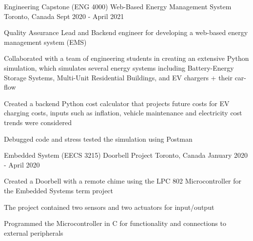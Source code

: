 


\begin{cventries}


\cventry
{Engineering Capstone (ENG 4000)} %
{Web-Based Energy Management System} %
{Toronto, Canada} %
{Sept 2020 - April 2021} %
{ %
\begin{cvitems}
\item {Quality Assurance Lead and Backend engineer for developing a web-based energy management system (EMS)}
\item {Collaborated with a team of engineering students in creating an extensive Python simulation, which simulates several energy systems including Battery-Energy Storage Systems, Multi-Unit Residential Buildings, and EV chargers + their car-flow}
\item {Created a backend Python cost calculator that projects future costs for EV charging costs, inputs such as inflation, vehicle maintenance and electricity cost trends were considered}
\item {Debugged code and stress tested the simulation using Postman}
\end{cvitems}
}

\cventry
{Embedded System (EECS 3215) }
{Doorbell Project }
{Toronto, Canada}
{January 2020 - April 2020}
{ %
\begin{cvitems}
\item {Created a Doorbell with a remote chime using the LPC 802 Microcontroller for the Embedded Systems term project}
\item {The project contained two sensors and two actuators for input/output}
\item {Programmed the Microcontroller in C for functionality and connections to external peripherals}
\end{cvitems}
}


\end{cventries}